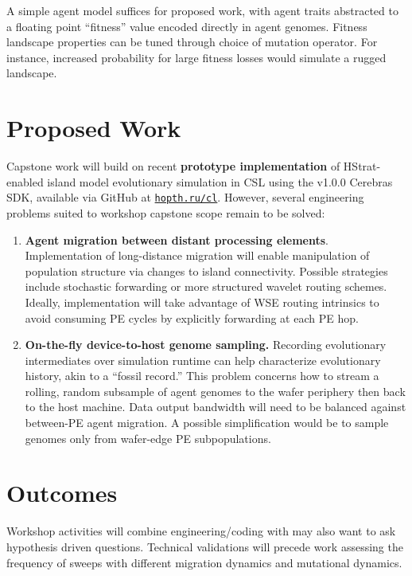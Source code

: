 A simple agent model suffices for proposed work, with agent traits abstracted to a floating point ``fitness'' value encoded directly in agent genomes.
Fitness landscape properties can be tuned through choice of mutation operator.
For instance, increased probability for large fitness losses would simulate a rugged landscape.

\section{Proposed Work}

Capstone work will build on recent \textbf{prototype implementation} of HStrat-enabled island model evolutionary simulation in CSL using the v1.0.0 Cerebras SDK, available via GitHub at \texttt{\href{https://hopth.ru/cl}{hopth.ru/cl}}.
However, several engineering problems suited to workshop capstone scope remain to be solved:
\begin{enumerate}[leftmargin=*]
\item \textbf{Agent migration between distant processing elements}.
Implementation of long-distance migration will enable manipulation of population structure via changes to island connectivity.
Possible strategies include stochastic forwarding or more structured wavelet routing schemes.
Ideally, implementation will take advantage of WSE routing intrinsics to avoid consuming PE cycles by explicitly forwarding at each PE hop.

\item \textbf{On-the-fly device-to-host genome sampling.}
Recording evolutionary intermediates over simulation runtime can help characterize evolutionary history, akin to a ``fossil record.''
This problem concerns how to stream a rolling, random subsample of agent genomes to the wafer periphery then back to the host machine.
Data output bandwidth will need to be balanced against between-PE agent migration.
A possible simplification would be to sample genomes only from wafer-edge PE subpopulations.
\end{enumerate}

\section{Outcomes}

Workshop activities will combine engineering/coding with may also want to ask hypothesis driven questions.
Technical validations will precede work assessing the frequency of sweeps with different migration dynamics and mutational dynamics.

